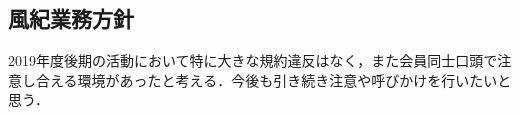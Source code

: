 \subsection*{風紀業務方針}

2019年度後期の活動において特に大きな規約違反はなく，また会員同士口頭で注意し合える環境があったと考える．今後も引き続き注意や呼びかけを行いたいと思う．
